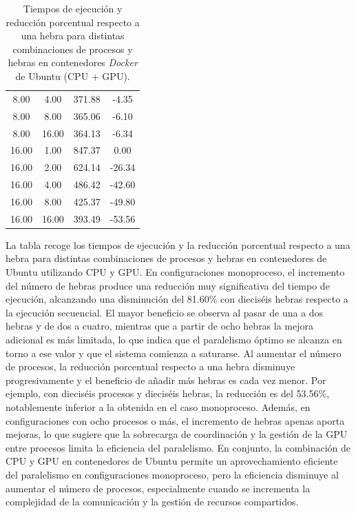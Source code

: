 \begin{table}[ht]
\begin{tabular}{|c|c|c|c|}
        8.00              & 4.00            & 371.88              & -4.35                          \\
        8.00              & 8.00            & 365.06              & -6.10                          \\
        8.00              & 16.00           & 364.13              & -6.34                          \\
        16.00             & 1.00            & 847.37              & 0.00                           \\
        16.00             & 2.00            & 624.14              & -26.34                         \\
        16.00             & 4.00            & 486.42              & -42.60                         \\
        16.00             & 8.00            & 425.37              & -49.80                         \\
        16.00             & 16.00           & 393.49              & -53.56                         \\
        \hline
    \end{tabular}
    \caption{Tiempos de ejecución y reducción porcentual respecto a una hebra para distintas combinaciones de procesos y hebras en contenedores \textit{Docker} de Ubuntu (CPU + GPU).}
    \label{tab:thread_sweep_ubuntu_docker_gpu_time}
\end{table}

La tabla recoge los tiempos de ejecución y la reducción porcentual respecto a una hebra para distintas combinaciones de procesos y hebras en contenedores de Ubuntu utilizando CPU y GPU. En configuraciones monoproceso, el incremento del número de hebras produce una reducción muy significativa del tiempo de ejecución, alcanzando una disminución del 81.60\% con dieciséis hebras respecto a la ejecución secuencial. El mayor beneficio se observa al pasar de una a dos hebras y de dos a cuatro, mientras que a partir de ocho hebras la mejora adicional es más limitada, lo que indica que el paralelismo óptimo se alcanza en torno a ese valor y que el sistema comienza a saturarse. Al aumentar el número de procesos, la reducción porcentual respecto a una hebra disminuye progresivamente y el beneficio de añadir más hebras es cada vez menor. Por ejemplo, con dieciséis procesos y dieciséis hebras, la reducción es del 53.56\%, notablemente inferior a la obtenida en el caso monoproceso. Además, en configuraciones con ocho procesos o más, el incremento de hebras apenas aporta mejoras, lo que sugiere que la sobrecarga de coordinación y la gestión de la GPU entre procesos limita la eficiencia del paralelismo. En conjunto, la combinación de CPU y GPU en contenedores de Ubuntu permite un aprovechamiento eficiente del paralelismo en configuraciones monoproceso, pero la eficiencia disminuye al aumentar el número de procesos, especialmente cuando se incrementa la complejidad de la comunicación y la gestión de recursos compartidos.

